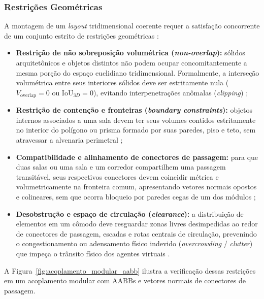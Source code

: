 \subsubsection{Restrições Geométricas}
\label{sec:restricoes_geometricas}

A montagem de um \textit{layout} tridimensional coerente requer a satisfação concorrente de um conjunto estrito de restrições geométricas \cite{linden2014dungeons, ericson2004realtime, xu2025constraint, xu2025databasedrivenframework3dlevel}:
\begin{itemize}
    \item \textbf{Restrição de não sobreposição volumétrica (\textit{non-overlap}):} sólidos arquitetônicos e objetos distintos não podem ocupar concomitantemente a mesma porção do espaço euclidiano tridimensional. Formalmente, a interseção volumétrica entre seus interiores sólidos deve ser estritamente nula ($V_{\text{overlap}} = 0$ ou $\text{IoU}_{3D} = 0$), evitando interpenetrações anômalas (\textit{clipping}) \cite{ericson2004realtime, xu2025constraint};
    \item \textbf{Restrição de contenção e fronteiras (\textit{boundary constraints}):} objetos internos associados a uma sala devem ter seus volumes contidos estritamente no interior do polígono ou prisma formado por suas paredes, piso e teto, sem atravessar a alvenaria perimetral \cite{xu2025constraint};
    \item \textbf{Compatibilidade e alinhamento de conectores de passagem:} para que duas salas ou uma sala e um corredor compartilhem uma passagem transitável, seus respectivos conectores devem coincidir métrica e volumetricamente na fronteira comum, apresentando vetores normais opostos e colineares, sem que ocorra bloqueio por paredes cegas de um dos módulos \cite{linden2013designing, shaker2016constructive, xu2025databasedrivenframework3dlevel};
    \item \textbf{Desobstrução e espaço de circulação (\textit{clearance}):} a distribuição de elementos em um cômodo deve resguardar zonas livres desimpedidas ao redor de conectores de passagem, escadas e rotas centrais de circulação, prevenindo o congestionamento ou adensamento físico indevido (\textit{overcrowding} / \textit{clutter}) que impeça o trânsito físico dos agentes virtuais \cite{xu2025constraint, xu2025databasedrivenframework3dlevel}.
\end{itemize}

A Figura~\ref{fig:acoplamento_modular_aabb} ilustra a verificação dessas restrições em um acoplamento modular com AABBs e vetores normais de conectores de passagem.

